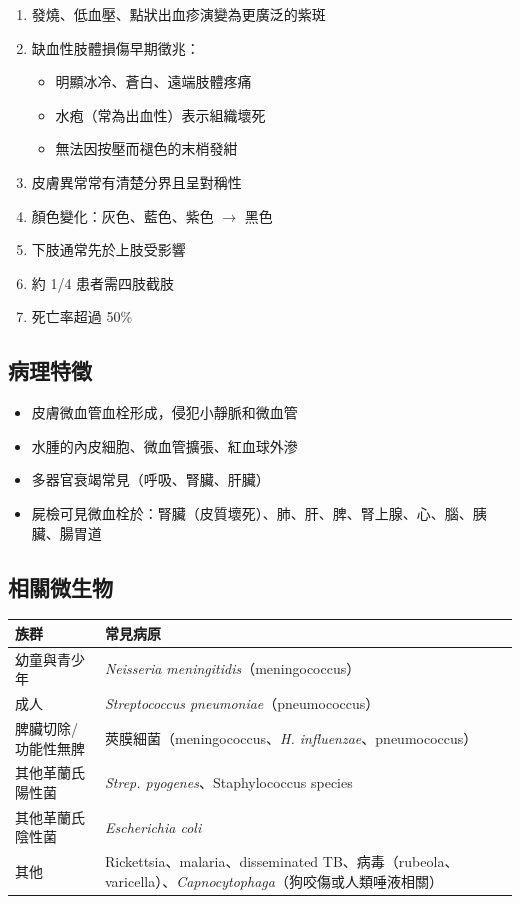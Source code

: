 \documentclass[12pt,a4paper]{article}
\begin{document}
\begin{enumerate}
    \item 發燒、低血壓、點狀出血疹演變為更廣泛的紫斑
    \item 缺血性肢體損傷早期徵兆：
    \begin{itemize}
        \item 明顯冰冷、蒼白、遠端肢體疼痛
        \item 水疱（常為出血性）表示組織壞死
        \item 無法因按壓而褪色的末梢發紺
    \end{itemize}
    \item 皮膚異常常有清楚分界且呈對稱性
    \item 顏色變化：灰色、藍色、紫色 $\rightarrow$ 黑色
    \item 下肢通常先於上肢受影響
    \item 約 1/4 患者需四肢截肢
    \item 死亡率超過 50\%
\end{enumerate}

\subsection{病理特徵}

\begin{itemize}
    \item 皮膚微血管血栓形成，侵犯小靜脈和微血管
    \item 水腫的內皮細胞、微血管擴張、紅血球外滲
    \item 多器官衰竭常見（呼吸、腎臟、肝臟）
    \item 屍檢可見微血栓於：腎臟（皮質壞死）、肺、肝、脾、腎上腺、心、腦、胰臟、腸胃道
\end{itemize}

\subsection{相關微生物}

\begin{longtable}{p{4cm}p{11cm}}
\toprule
\textbf{族群} & \textbf{常見病原} \\
\midrule
\endfirsthead
幼童與青少年 & \textit{Neisseria meningitidis}（meningococcus） \\
\midrule
成人 & \textit{Streptococcus pneumoniae}（pneumococcus） \\
\midrule
脾臟切除/功能性無脾 & 莢膜細菌（meningococcus、\textit{H. influenzae}、pneumococcus） \\
\midrule
其他革蘭氏陽性菌 & \textit{Strep. pyogenes}、Staphylococcus species \\
\midrule
其他革蘭氏陰性菌 & \textit{Escherichia coli} \\
\midrule
其他 & Rickettsia、malaria、disseminated TB、\newline 病毒（rubeola、varicella）、\newline \textit{Capnocytophaga}（狗咬傷或人類唾液相關） \\
\bottomrule
\end{longtable}
\end{document}
